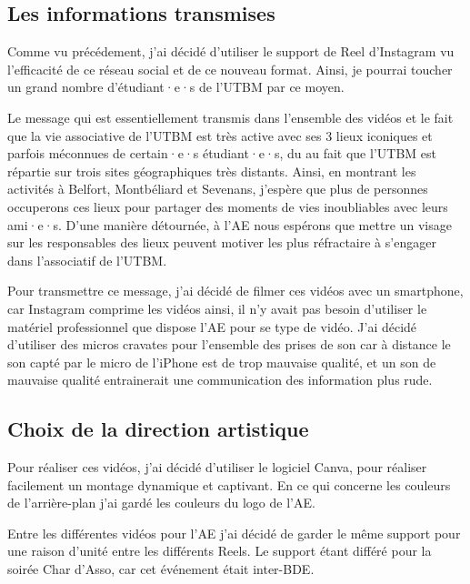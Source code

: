 \subsection{Les informations transmises}\label{subsec:les-informations-transmises}


Comme vu précédement, j'ai décidé d'utiliser le support de Reel d'Instagram vu l'efficacité de ce réseau social et de ce nouveau format.
Ainsi, je pourrai toucher un grand nombre d'étudiant·e·s de l'\gls{UTBM} par ce moyen.

Le message qui est essentiellement transmis dans l'ensemble des vidéos et le fait que la vie associative de l'\gls{UTBM} est très active avec ses 3 lieux iconiques et parfois méconnues de certain·e·s étudiant·e·s, du au fait que l'\gls{UTBM} est répartie sur trois sites géographiques très distants.
Ainsi, en montrant les activités à Belfort, Montbéliard et Sevenans, j'espère que plus de personnes occuperons ces lieux pour partager des moments de vies inoubliables avec leurs ami·e·s.
D'une manière détournée, à l'\gls{AE} nous espérons que mettre un visage sur les responsables des lieux peuvent motiver les plus réfractaire à s'engager dans l'associatif de l'\gls{UTBM}.

Pour transmettre ce message, j'ai décidé de filmer ces vidéos avec un smartphone, car Instagram comprime les vidéos ainsi, il n'y avait pas besoin d'utiliser le matériel professionnel que dispose l'\gls{AE} pour se type de vidéo.
J'ai décidé d'utiliser des micros cravates pour l'ensemble des prises de son car à distance le son capté par le micro de l'iPhone est de trop mauvaise qualité, et un son de mauvaise qualité entrainerait une communication des information plus rude.


\subsection{Choix de la direction artistique}\label{subsec:choix-de-la-direction-artistique}

Pour réaliser ces vidéos, j'ai décidé d'utiliser le logiciel Canva, pour réaliser facilement un montage dynamique et captivant.
En ce qui concerne les couleurs de l'arrière-plan j'ai gardé les couleurs du logo de l'\gls{AE}.

Entre les différentes vidéos pour l'\gls{AE} j'ai décidé de garder le même support pour une raison d'unité entre les différents Reels.
Le support étant différé pour la soirée Char d'Asso, car cet événement était inter-BDE.


